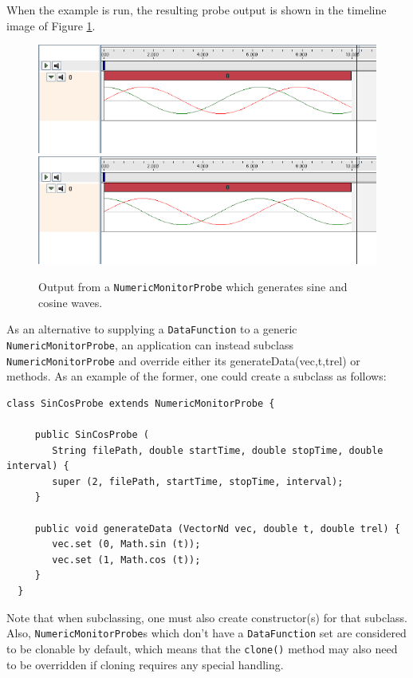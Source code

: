 When the example is run, the resulting probe output is shown in the
timeline image of Figure \ref{sinCosProbe:fig}.

\begin{figure}[ht]
\begin{center}
\iflatexml
 \includegraphics[]{images/sinCosProbe}
\else
 \includegraphics[width=4.5in]{images/sinCosProbe}
\fi
\end{center}
\caption{Output from a {\tt NumericMonitorProbe} which generates sine
and cosine waves.}
\label{sinCosProbe:fig}
\end{figure}

As an alternative to supplying a {\tt DataFunction} to a generic {\tt
NumericMonitorProbe}, an application can instead subclass {\tt
NumericMonitorProbe} and override either its %
{generateData(vec,t,trel)} or 
methods. As an example of the former, one could create a subclass as
follows:
%
\begin{lstlisting}[]
  class SinCosProbe extends NumericMonitorProbe {
     
     public SinCosProbe (
        String filePath, double startTime, double stopTime, double interval) {
        super (2, filePath, startTime, stopTime, interval);
     }

     public void generateData (VectorNd vec, double t, double trel) {
        vec.set (0, Math.sin (t));
        vec.set (1, Math.cos (t));        
     }
  }
\end{lstlisting}
%
Note that when subclassing, one must also create constructor(s) for
that subclass. Also, {\tt NumericMonitorProbe}s which don't have a
{\tt DataFunction} set are considered to be clonable by default, which
means that the {\tt clone()} method may also need to be overridden if
cloning requires any special handling.


